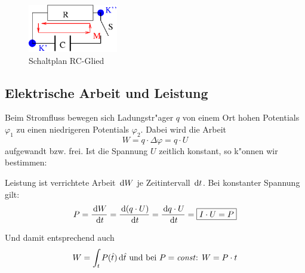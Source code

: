 \begin{figure}
   \centering
\includegraphics[width=0.35\textwidth]{bilder/RC}
\caption{Schaltplan
  RC-Glied}\label{abb_kondensatorentladung_schaltplan}
   \label{abb_kondensatorentladung}
\end{figure}










\subsection{Elektrische Arbeit und Leistung}
\label{kap_ekeltrische-arbeit-und-leistung}

Beim Stromfluss bewegen sich Ladungstr"ager $q$ von einem Ort hohen
Potentials $\varphi_1$ zu einen niedrigeren Potentials
$\varphi_2$. Dabei wird die Arbeit
\begin{equation}
   \label{eqn_differenz-c82}
   W = q \cdot \Delta \varphi = q \cdot U
\end{equation}
aufgewandt bzw. frei. Ist die Spannung $U$ zeitlich konstant, so
k"onnen wir bestimmen:
\begin{Def}
    Leistung ist
   verrichtete Arbeit $\, \mathrm{d} W$ je Zeitintervall $\, \mathrm{d} t$. Bei
   konstanter Spannung gilt:
   \begin{equation}
      \label{eqn_differenz-c83}
      P = \frac{\, \mathrm{d} W}{\, \mathrm{d} t} =
\frac{\, \mathrm{d} (q \cdot U)}{\, \mathrm{d} t} =
\frac{\, \mathrm{d} q \cdot U}{\, \mathrm{d} t} =
\boxed{ I \cdot U = P}
   \end{equation}
\end{Def}
Und damit entsprechend auch
\begin{equation}
   \label{eqn_differenz-c81}
   W = \int_t P(\hat t) \, \mathrm{d} \hat t \text{ und bei $P = \text{\emph{const}}$: } W = P \cdot t
\end{equation}

